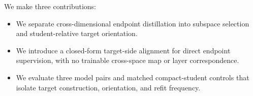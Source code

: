 We make three contributions:
\begin{itemize}
    \item We separate cross-dimensional endpoint distillation into subspace
    selection and student-relative target orientation.
    \item We introduce a closed-form target-side alignment for direct endpoint
    supervision, with no trainable cross-space map or layer correspondence.
    \item We evaluate three model pairs and matched compact-student controls
    that isolate target construction, orientation, and refit frequency.
\end{itemize}
